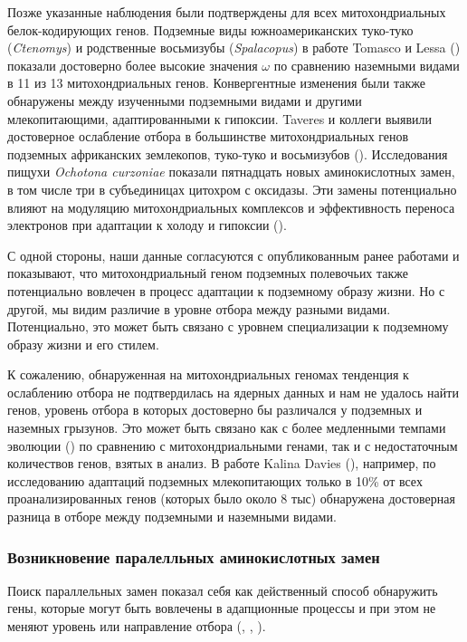 Позже указанные наблюдения были подтверждены для всех митохондриальных белок-кодирующих генов. Подземные виды южноамериканских туко-туко (\textit{Ctenomys}) и родственные восьмизубы (\textit{Spalacopus}) в работе Tomasco и Lessa (\cite{Tomasco2011}) показали достоверно более высокие значения $\omega$ по сравнению наземными видами в 11 из 13 митохондриальных генов. Конвергентные изменения были также обнаружены между изученными подземными видами и другими млекопитающими, адаптированными к гипоксии. Taveres и коллеги выявили достоверное ослабление отбора в большинстве митохондриальных генов подземных африканских землекопов, туко-туко и восьмизубов (\cite{Tavares2018}). Исследования пищухи \textit{Ochotona curzoniae} показали пятнадцать новых аминокислотных замен, в том числе три в субъединицах цитохром с оксидазы. Эти замены потенциально влияют на модуляцию митохондриальных комплексов и эффективность переноса электронов при адаптации к холоду и гипоксии (\cite{Luo2008}).


С одной стороны, наши данные согласуются с опубликованным ранее работами и показывают, что митохондриальный геном подземных полевочьих также потенциально вовлечен в процесс адаптации к подземному образу жизни. Но с другой, мы видим различие в уровне отбора между разными видами. Потенциально, это может быть связано с уровнем специализации к подземному образу жизни и его стилем.


К сожалению, обнаруженная на митохондриальных геномах тенденция к ослаблению отбора не подтвердилась на ядерных данных и нам не удалось найти генов, уровень отбора в которых достоверно бы различался у подземных и наземных грызунов. Это может быть связано как с более медленными темпами эволюции (\cite{Lin2004}) по сравнению с митохондриальными генами, так и с недостаточным количествов генов, взятых в анализ. В работе Kalina Davies (\cite{Davies2018}), например, по исследованию адаптаций подземных млекопитающих только в 10\% от всех проанализированных генов (которых было около 8 тыс) обнаружена достоверная разница в отборе между подземными и наземными видами. 


\subsubsection*{Возникновение паралелльных аминокислотных замен}
Поиск параллельных замен показал себя как действенный способ обнаружить гены, которые могут быть вовлечены в адапционные процессы и при этом не меняют уровень или направление отбора (\cite{Davies2018}, \cite{Zhou2015}, \cite{Sackman2017}). 

